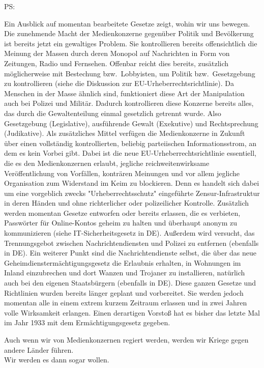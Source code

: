 \documentclass[a4paper,8pt]{extarticle}
\begin{document}
{\small PS:

Ein Ausblick auf momentan bearbeitete Gesetze zeigt, wohin wir uns bewegen. Die zunehmende Macht der Medienkonzerne gegenüber Politik und Bevölkerung ist bereits jetzt ein gewaltiges Problem. Sie kontrollieren bereits offensichtlich die Meinung der Massen durch deren Monopol auf Nachrichten in Form von Zeitungen, Radio und Fernsehen. Offenbar reicht dies bereits, zusätzlich möglicherweise mit Bestechung bzw.\ Lobbyisten, um Politik bzw.\ Gesetzgebung zu kontrollieren (siehe die Diskussion zur EU-Urheberrechtsrichtlinie). Da Menschen in der Masse ähnlich sind, funktioniert diese Art der Manipulation auch bei Polizei und Militär. Dadurch kontrollieren diese Konzerne bereits alles, das durch die Gewaltenteilung einmal gesetzlich getrennt wurde. Also Gesetzgebung (Legislative), ausführende Gewalt (Exekutive) und Rechtsprechung (Judikative). Als zusätzliches Mittel verfügen die Medienkonzerne in Zukunft über einen vollständig kontrollierten, beliebig parteiischen Informationsstrom, an dem es kein Vorbei gibt. Dabei ist die neue EU-Urheberrechtsrichtlinie essentiell, die es den Medienkonzernen erlaubt, jegliche reichweitenwirksame Veröffentlichung von Vorfällen, konträren Meinungen und vor allem jegliche Organisation zum Widerstand im Keim zu blockieren. Denn es handelt sich dabei um eine vorgeblich zwecks "Urheberrechtsschutz" eingeführte Zensur-Infrastruktur in deren Händen und ohne richterlicher oder polizeilicher Kontrolle. Zusätzlich werden momentan Gesetze entworfen oder bereits erlassen, die es verbieten, Passwörter für Online-Kontos geheim zu halten und überhaupt anonym zu kommunizieren (siehe IT-Sicherheitsgesetz in DE). Außerdem wird versucht, das Trennungsgebot zwischen Nachrichtendiensten und Polizei zu entfernen (ebenfalls in DE). Ein weiterer Punkt sind die Nachrichtendienste selbst, die über das neue Geheimdienstermächtigungsgesetz die Erlaubnis erhalten, in Wohnungen im Inland einzubrechen und dort Wanzen und Trojaner zu installieren, natürlich auch bei den eigenen Staatsbürgern (ebenfalls in DE). Diese ganzen Gesetze und Richtlinien wurden bereits länger geplant und vorbereitet. Sie werden jedoch momentan alle in einem extrem kurzem Zeitraum erlassen und in zwei Jahren volle Wirksamkeit erlangen. Einen derartigen Vorstoß hat es bisher das letzte Mal im Jahr 1933 mit dem Ermächtigungsgesetz gegeben.

Auch wenn wir von Medienkonzernen regiert werden, werden wir Kriege gegen andere Länder führen.\\
Wir werden es dann sogar wollen.}
\end{document}
